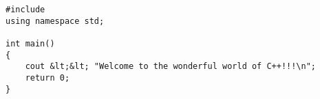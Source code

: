 \begin{lstlisting}[caption={测试代码}]
#include
using namespace std;
 
int main()
{
	cout &lt;&lt; "Welcome to the wonderful world of C++!!!\n";
	return 0;
}
\end{lstlisting}